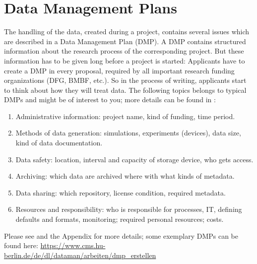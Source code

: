 \section{Data Management Plans}

The handling of the data, created during a project, contains several issues
which are described in a Data Management Plan (DMP). A DMP contains structured
information about the research process of the corresponding project. But these
information has to be given long before a project is started: Applicants have
to create a DMP in every proposal, required by all important research funding
organizations (DFG, BMBF, etc.). So in the process of writing, applicants start
to think about how they will treat data. The following topics belongs to typical
DMPs and might be of interest to you; more details can be found in
\cite{dfg2021,hannover2020}:
\begin{enumerate}
  \item Administrative information: project name, kind of funding, time period.
  \item Methods of data generation: simulations, experiments (devices),
        data size, kind of data documentation.
  \item Data safety: location, interval and capacity of storage device,
        who gets access.
  \item Archiving: which data are archived where with what kinds of metadata.
  \item Data sharing: which repository, license condition, required metadata.
  \item Resources and responsibility: who is responsible for processes, IT,
        defining defaults and formats, monitoring; required personal resources;
        costs.
\end{enumerate}
Please see \cite{dfg2021,hannover2020} and the Appendix for more details; some exemplary DMPs can be found here:
\url{https://www.cms.hu-berlin.de/de/dl/dataman/arbeiten/dmp_erstellen}
